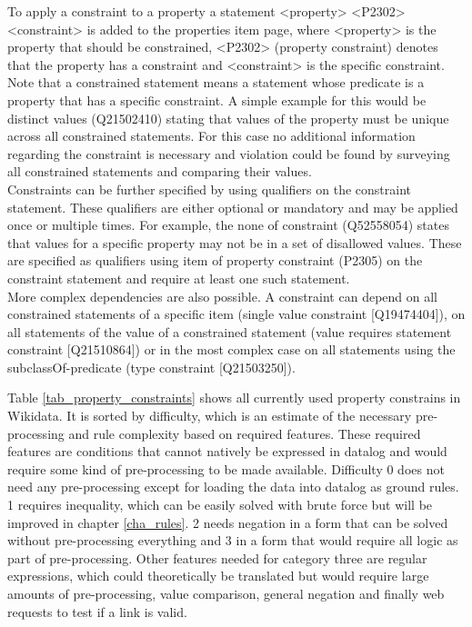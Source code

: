 \documentclass[hyperref,bachelorofscience,fleqn]{cgvpub}
\begin{document}
To apply a constraint to a property a statement <property> <P2302> <constraint> is added to the properties item page, where <property> is the property that should be constrained, <P2302> (property constraint) denotes that the property has a constraint and <constraint> is the specific constraint. Note that a constrained statement means a statement whose predicate is a property that has a specific constraint. A simple example for this would be distinct values (Q21502410) stating that values of the property must be unique across all constrained statements. For this case no additional information regarding the constraint is necessary and violation could be found by surveying all constrained statements and comparing their values.\\
Constraints can be further specified by using qualifiers on the constraint statement. These qualifiers are either optional or mandatory and may be applied once or multiple times. For example, the none of constraint (Q52558054) states that values for a specific property may not be in a set of disallowed values. These are specified as qualifiers using item of property constraint (P2305) on the constraint statement and require at least one such statement.\\
More complex dependencies are also possible. A constraint can depend on all constrained statements of a specific item (single value constraint [Q19474404]), on all statements of the value of a constrained statement (value requires statement constraint [Q21510864]) or in the most complex case on all statements using the subclassOf-predicate (type constraint [Q21503250]).

Table \ref{tab_property_constraints} shows all currently used property constrains in Wikidata. It is sorted by difficulty, which is an estimate of the necessary pre-processing and rule complexity based on required features. These required features are conditions that cannot natively be expressed in datalog and would require some kind of pre-processing to be made available. Difficulty 0 does not need any pre-processing except for loading the data into datalog as ground rules. 1 requires inequality, which can be easily solved with brute force but will be improved in chapter \ref{cha_rules}. 2 needs negation in a form that can be solved without pre-processing everything and 3 in a form that would require all logic as part of pre-processing. Other features needed for category three are regular expressions, which could theoretically be translated but would require large amounts of pre-processing, value comparison, general negation and finally web requests to test if a link is valid.
\end{document}
